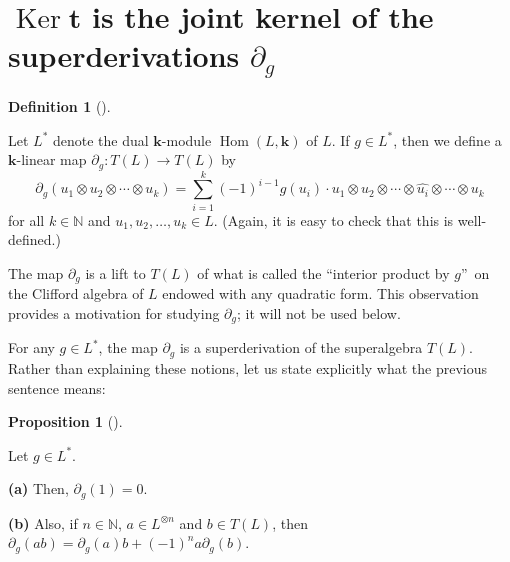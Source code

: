 \documentclass[numbers=enddot,12pt,final,onecolumn,notitlepage]{scrartcl}%
\theoremstyle{definition}
\newtheorem{prop}[theo]{Proposition}
\newenvironment{proposition}[1][]
{\begin{prop}[#1]\begin{leftbar}}
{\end{leftbar}\end{prop}}
\newtheorem{defi}[theo]{Definition}
\newenvironment{definition}[1][]
{\begin{defi}[#1]\begin{leftbar}}
{\end{leftbar}\end{defi}}
\let\sumnonlimits\sum
\renewcommand{\sum}{\sumnonlimits\limits}
\begin{document}
\section{$\operatorname*{Ker}\mathbf{t}$ is the joint kernel of the
superderivations $\partial_{g}$}

\begin{definition}
\label{def.deltag}Let $L^{\ast}$ denote the dual $\mathbf{k}$-module
$\operatorname*{Hom}\left(  L,\mathbf{k}\right)  $ of $L$. If $g\in L^{\ast}$,
then we define a $\mathbf{k}$-linear map $\partial_{g}:T\left(  L\right)
\rightarrow T\left(  L\right)  $ by%
\[
\partial_{g}\left(  u_{1}\otimes u_{2}\otimes\cdots\otimes u_{k}\right)
=\sum_{i=1}^{k}\left(  -1\right)  ^{i-1}g\left(  u_{i}\right)  \cdot
u_{1}\otimes u_{2}\otimes\cdots\otimes\widehat{u_{i}}\otimes\cdots\otimes
u_{k}%
\]
for all $k\in\mathbb{N}$ and $u_{1},u_{2},\ldots,u_{k}\in L$. (Again, it is
easy to check that this is well-defined.)
\end{definition}

The map $\partial_{g}$ is a lift to $T\left(  L\right)  $ of what is called
the \textquotedblleft interior product by $g$\textquotedblright\ on the
Clifford algebra of $L$ endowed with any quadratic form. This observation
provides a motivation for studying $\partial_{g}$; it will not be used below.

For any $g\in L^{\ast}$, the map $\partial_{g}$ is a superderivation of the
superalgebra $T\left(  L\right)  $. Rather than explaining these notions, let
us state explicitly what the previous sentence means:

\begin{proposition}
\label{prop.1}Let $g\in L^{\ast}$. \medskip

\textbf{(a)} Then, $\partial_{g}\left(  1\right)  =0$. \medskip

\textbf{(b)} Also, if $n\in\mathbb{N}$, $a\in L^{\otimes n}$ and $b\in
T\left(  L\right)  $, then $\partial_{g}\left(  ab\right)  =\partial
_{g}\left(  a\right)  b+\left(  -1\right)  ^{n}a\partial_{g}\left(  b\right)
$.
\end{proposition}
\end{document}
